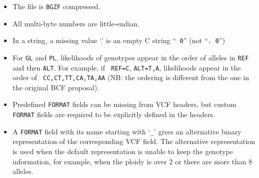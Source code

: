 \documentclass[10pt,pdftex]{article}
\begin{document}
\begin{itemize}
\item The file is {\tt BGZF} compressed.
\item All multi-byte numbers are little-endian.
\item In a string, a missing value `.' is an empty C string ``{\tt
     0}'' (not ``{\tt . 0}'')
\item For {\tt GL} and {\tt PL}, likelihoods of genotypes appear in the
  order of alleles in {\tt REF} and then {\tt ALT}. For example, if {\tt
    REF=C}, {\tt ALT=T,A}, likelihoods appear in the order of {\tt
    CC,CT,TT,CA,TA,AA} (NB: the ordering is different from the one in the original
	BCF proposal).
\item Predefined {\tt FORMAT} fields can be missing from VCF headers, but custom {\tt FORMAT} fields
	are required to be explicitly defined in the headers.
\item A {\tt FORMAT} field with its name starting with `{\tt \_}' gives an alternative
	binary representation of the corresponding VCF field. The alternative representation
	is used when the default representation is unable to keep the genotype information,
	for example, when the ploidy is over 2 or there are more than 8 alleles.
\end{itemize}
\end{document}
